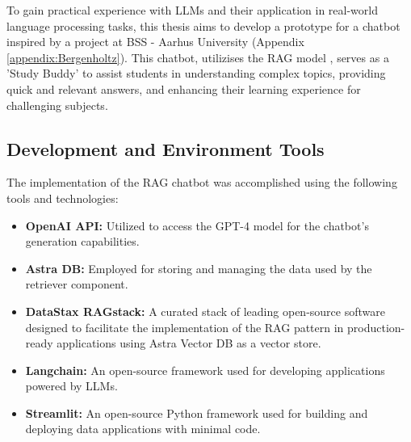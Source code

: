     To gain practical experience with LLMs and their application in real-world language processing tasks, this thesis aims to develop a prototype for a chatbot inspired by a project at BSS - Aarhus University (Appendix \ref{appendix:Bergenholtz}). This chatbot, utilizises the RAG model \cite{lewis2020RAG}, serves as a 'Study Buddy' to assist students in understanding complex topics, providing quick and relevant answers, and enhancing their learning experience for challenging subjects.

    \subsection{Development and Environment Tools}
    The implementation of the RAG chatbot was accomplished using the following tools and technologies:
    \begin{itemize}
        \item \textbf{OpenAI API:} Utilized to access the GPT-4 model for the chatbot's generation capabilities.
        \item \textbf{Astra DB:} Employed for storing and managing the data used by the retriever component.
        \item \textbf{DataStax RAGstack:} A curated stack of leading open-source software designed to facilitate the implementation of the RAG pattern in production-ready applications using Astra Vector DB as a vector store.
        \item \textbf{Langchain:} An open-source framework used for developing applications powered by LLMs.
        \item \textbf{Streamlit:} An open-source Python framework used for building and deploying data applications with minimal code.
    \end{itemize}

